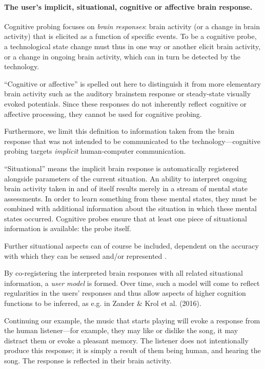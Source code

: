 \paragraph{The user's implicit, situational, cognitive or affective brain response.} Cognitive probing focuses on \emph{brain responses}: brain activity (or a change in brain activity) that is elicited as a function of specific events. To be a cognitive probe, a technological state change must thus in one way or another elicit brain activity, or a change in ongoing brain activity, which can in turn be detected by the technology.

``Cognitive or affective'' is spelled out here to distinguish it from more elementary brain activity such as the auditory brainstem response or steady-state visually evoked potentials. Since these responses do not inherently reflect cognitive or affective processing, they cannot be used for cognitive probing.

Furthermore, we limit this definition to information taken from the brain response that was not intended to be communicated to the technology---cognitive probing targets \emph{implicit} human-computer communication. 

``Situational'' means the implicit brain response is automatically registered alongside parameters of the current situation. An ability to interpret ongoing brain activity taken in and of itself results merely in a stream of mental state assessments. In order to learn something from these mental states, they must be combined with additional information about the situation in which these mental states occurred. Cognitive probes ensure that at least one piece of situational information is available: the probe itself. 

Further situational aspects can of course be included, dependent on the accuracy with which they can be sensed and/or represented \cite{perera2014contextsurvey}.

By co-registering the interpreted brain responses with all related situational information, a \emph{user model} is formed. Over time, such a model will come to reflect regularities in the users' responses and thus allow aspects of higher cognition functions to be inferred, as e.g. in Zander \& Krol et al. (2016).

Continuing our example, the music that starts playing will evoke a response from the human listener---for example, they may like or dislike the song, it may distract them or evoke a pleasant memory. The listener does not intentionally produce this response; it is simply a result of them being human, and hearing the song. The response is reflected in their brain activity.


